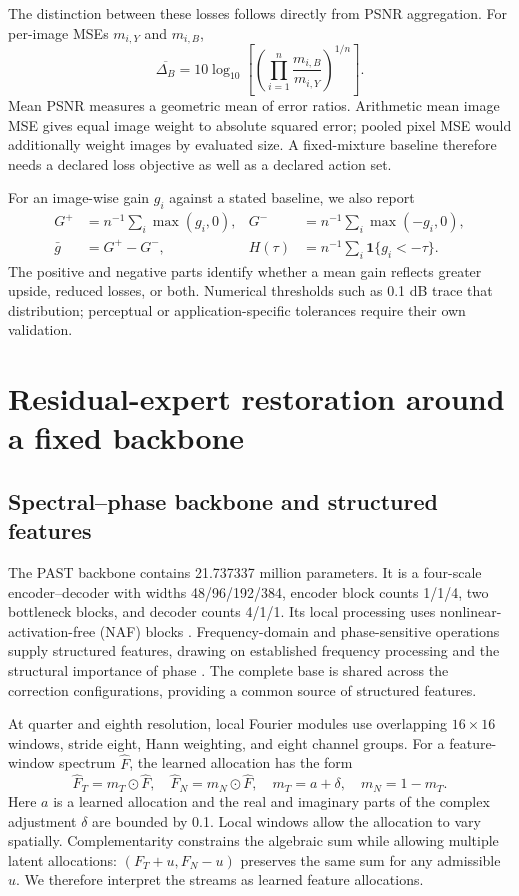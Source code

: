 \documentclass[12pt]{article}
\begin{document}
The distinction between these losses follows directly from PSNR aggregation. For per-image MSEs $m_{i,Y}$ and $m_{i,B}$,
\begin{equation}
\overline{\Delta_B}=10\log_{10}\!\left[
\left(\prod_{i=1}^{n}\frac{m_{i,B}}{m_{i,Y}}\right)^{1/n}\right]. \label{eq:geometric}
\end{equation}
Mean PSNR measures a geometric mean of error ratios. Arithmetic mean image MSE gives equal image weight to absolute squared error; pooled pixel MSE would additionally weight images by evaluated size. A fixed-mixture baseline therefore needs a declared loss objective as well as a declared action set.

For an image-wise gain $g_i$ against a stated baseline, we also report
\begin{align}
G^+&=n^{-1}\sum_i\max(g_i,0),&G^-&=n^{-1}\sum_i\max(-g_i,0),\\
\bar g&=G^+-G^-,&H(\tau)&=n^{-1}\sum_i\mathbf1\{g_i<-\tau\}.\label{eq:loss-profile}
\end{align}
The positive and negative parts identify whether a mean gain reflects greater upside, reduced losses, or both. Numerical thresholds such as 0.1 dB trace that distribution; perceptual or application-specific tolerances require their own validation.

\section{Residual-expert restoration around a fixed backbone}
\label{sec:method}
\subsection{Spectral--phase backbone and structured features}
The PAST backbone contains 21.737337 million parameters. It is a four-scale encoder--decoder with widths 48/96/192/384, encoder block counts 1/1/4, two bottleneck blocks, and decoder counts 4/1/1. Its local processing uses nonlinear-activation-free (NAF) blocks \citep{chen2022nafnet}. Frequency-domain and phase-sensitive operations supply structured features, drawing on established frequency processing and the structural importance of phase \citep{kong2023fftformer,oppenheim1981phase}. The complete base is shared across the correction configurations, providing a common source of structured features.

At quarter and eighth resolution, local Fourier modules use overlapping $16\times16$ windows, stride eight, Hann weighting, and eight channel groups. For a feature-window spectrum $\widehat F$, the learned allocation has the form
\begin{equation}
\widehat F_T=m_T\odot\widehat F,\quad
\widehat F_N=m_N\odot\widehat F,\quad
m_T=a+\delta,\quad m_N=1-m_T.
\end{equation}
Here $a$ is a learned allocation and the real and imaginary parts of the complex adjustment $\delta$ are bounded by 0.1. Local windows allow the allocation to vary spatially. Complementarity constrains the algebraic sum while allowing multiple latent allocations: $(F_T+u,F_N-u)$ preserves the same sum for any admissible $u$. We therefore interpret the streams as learned feature allocations.
\end{document}
